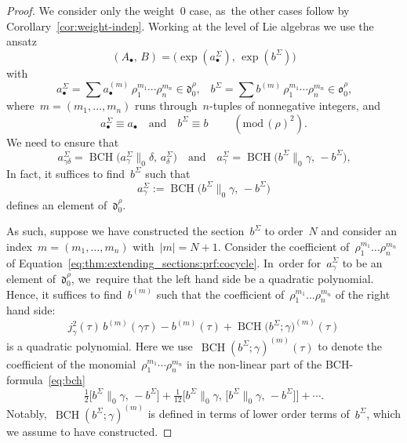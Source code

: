 \documentclass[JEP,XML,SOM,Unicode,published]{cedram}
\let\oldbullet\bullet
\renewcommand{\bullet}{{\scriptscriptstyle\oldbullet}}
\theoremstyle{plain}
\theoremstyle{definition}
\newcommand{\tx}{\text}
\newcommand{\nbd}{\nobreakdash-\hspace{0pt}}
\newcommand{\frakd}{\ensuremath{\mathfrak{d}}}
\newcommand{\frako}{\ensuremath{\mathfrak{o}}}
\newcommand{\defeq}{:=}
\renewcommand{\pmod}[1]{\;(\mathrm{mod}\, #1)}
\let\ga\gamma
\DeclareMathOperator{\BCH}{BCH}
\begin{document}
\begin{proof}
We consider only the weight~$0$ case, as~the other cases follow by Corollary~\ref{cor:weight-indep}.
Working at the level of Lie algebras we use the ansatz
\begin{equation*}
(A_\bullet,\, B)
=
\bigl(
\exp(a^\Sigma_\bullet),\,
\exp(b^\Sigma)
\bigr)
\end{equation*}
with
\begin{equation*}
a^\Sigma_\bullet
=
\sum a^{(m)}_\bullet\, \rho_1^{m_1} \cdots \rho_n^{m_n}
\in
\frakd_0^\rho
\tx{,}\quad
b^\Sigma
=
\sum b^{(m)}\, \rho_1^{m_1} \cdots \rho_n^{m_n}
\in
\frako_0^\rho
\tx{,}
\end{equation*}
where~$m = (m_1,\ldots,m_n)$ runs through~$n$\nbd{}tuples of nonnegative integers, and
\begin{equation*}
a^\Sigma_\bullet
\equiv
a_\bullet
\quad\tx{and}\quad
b^\Sigma
\equiv
b
\qquad\pmod{(\rho)^2}
\tx{.}
\end{equation*}
We need to ensure that
\begin{equation*}
a^\Sigma_{\ga\delta} = \BCH\bigl(a^\Sigma_\ga\big\|_0\delta,\, a^\Sigma_\delta \bigr)
\quad\tx{and}\quad
a^\Sigma_\ga = \BCH\bigl(b^\Sigma\big\|_0\ga,\, -b^\Sigma \bigr)
\tx{,}
\end{equation*}
In fact, it suffices to find~$b^\Sigma$ such that
\begin{equation}
\label{eq:thm:extending_sections:prf:cocycle}
a^\Sigma_\ga
\defeq
\BCH\bigl(b^\Sigma\|_0\ga,\, -b^\Sigma \bigr)
\end{equation}
defines an element of~$\frakd_0^\rho$.

As such, suppose we have constructed the section~$b^\Sigma$ to order~$N$ and consider an index~$m=(m_1,\ldots,m_n)$ with~$|m|=N+1$. Consider the coefficient of~$\rho_1^{m_1}\ldots\rho_n^{m_n}$ of Equation~\eqref{eq:thm:extending_sections:prf:cocycle}. In~order for~$a^\Sigma_\ga$ to be an element of~$\frakd_0^\rho$, we~require that the left hand side be a quadratic polynomial. Hence, it suffices to find~$b^{(m)}$ such that the coefficient of~$\rho_1^{m_1}\ldots\rho_n^{m_n}$ of the right hand side:
\begin{equation}\label{eq:log-section-construction}
j_\ga^2(\tau)\,b^{(m)}(\ga\tau)
- b^{(m)}(\tau)
+ \BCH\bigl(b^\Sigma;\ga \bigr)^{(m)}(\tau)
\end{equation}
is a quadratic polynomial. Here we use~$\BCH(b^\Sigma;\ga)^{(m)}(\tau)$ to denote the coefficient of the monomial~$\rho_1^{m_1}\cdots\rho_n^{m_n}$ in the non-linear part of the BCH-formula~\eqref{eq:bch}
\begin{equation*}
\tfrac{1}{2}
\big[ b^\Sigma\big\|_0\ga,\, -b^\Sigma \big]
+ \tfrac{1}{12}
\Big[ b^\Sigma\big\|_0\ga,\, \big[b^\Sigma\big\|_0\ga,\, -b^\Sigma\big] \Big]
+ \cdots
\tx{.}
\end{equation*}
Notably,~$\BCH(b^\Sigma;\ga)^{(m)}$ is defined in terms of lower order terms of~$b^\Sigma$, which we assume to have constructed.


\end{proof}
\end{document}
